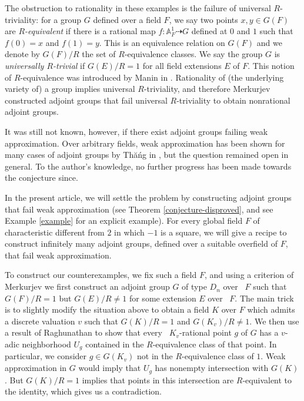 \documentclass[11pt,letterpaper]{amsart}
\theoremstyle{plain}
\theoremstyle{definition}
\theoremstyle{remark}
\begin{document}
    The obstruction to rationality in these examples is the failure of universal $R$-triviality: for a group $G$ defined over a field $F$, we say two points $x,y\in G(F)$ are \emph{$R$-equivalent} if there is a rational map $f\colon \mathbb{A}_F^1\dashrightarrow G$ defined at $0$ and $1$ such that $f(0) = x$ and $f(1) = y$. This is an equivalence relation on $G(F)$ and we denote by $G(F)/R$ the set of $R$-equivalence classes. We say the group $G$ is \emph{universally $R$-trivial} if $G(E)/R=1$ for all field extensions $E$ of $F$. This notion of $R$-equivalence was introduced by Manin in \cite{manin1986cubic}. Rationality of (the underlying variety of) a group implies universal $R$-triviality, and therefore Merkurjev constructed adjoint groups that fail universal $R$-triviality to obtain nonrational adjoint groups. 
    
    It was still not known, however, if there exist adjoint groups failing weak approximation. Over arbitrary fields, weak approximation has been shown for many cases of adjoint groups by Th\u{a}\'{n}g in \cite{thuang1996weak}, but the question remained open in general. To the author's knowledge, no further progress has been made towards the conjecture since.

    In the present article, we will settle the problem by constructing adjoint groups that fail weak approximation (see Theorem \ref{conjecture-disproved}, and see Example \ref{example} for an explicit example).
    For every global field $F$ of characteristic different from $2$ in which $-1$ is a square, we will give a recipe to construct infinitely many adjoint groups, defined over a suitable overfield of $F$, that fail weak approximation.

    To construct our counterexamples, we fix such a field $F$, and using a criterion of Merkurjev we first construct an adjoint group $G$ of type $D_n$ over~ $F$ such that $G(F)/R=1$ but $G(E)/R\neq 1$ for some extension $E$ over~ $F$. The main trick is to slightly modify the situation above to obtain a field $K$ over $F$ which admits a discrete valuation $v$ such that $G(K)/R=1$ and $G(K_v)/R\neq 1$. 
    We then use a result of Raghunathan to show that every~ $K_v$-rational point $g$ of $G$ has a $v$-adic neighborhood $U_g$ contained in the $R$-equivalence class of that point. In particular, we consider $g\in G(K_v)$ not in the $R$-equivalence class of $1$. Weak approximation in $G$ would imply that $U_g$ has nonempty intersection with $G(K)$. But $G(K)/R=1$ implies that points in this intersection are $R$-equivalent to the identity, which gives us a contradiction.
\end{document}
